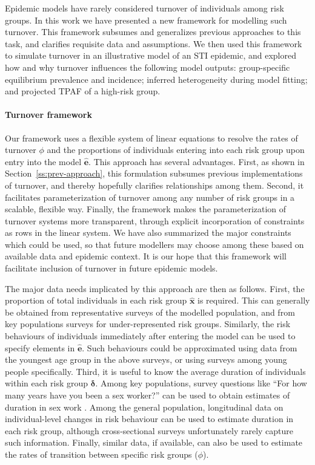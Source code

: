 Epidemic models have rarely considered turnover of individuals among risk groups.
In this work we have presented a new framework for modelling such turnover.
This framework subsumes and generalizes previous approaches to this task,
and clarifies requisite data and assumptions.
We then used this framework to simulate turnover in
an illustrative model of an STI epidemic,
and explored how and why turnover influences the following model outputs:
group-specific equilibrium prevalence and incidence;
inferred heterogeneity during model fitting; and
projected TPAF of a high-risk group.
\paragraph{Turnover framework}
Our framework uses a flexible system of linear equations to resolve
the rates of turnover $\phi$ and
the proportions of individuals entering into each risk group upon entry into the model $\bm{\hat{e}}$.
This approach has several advantages.
First, as shown in Section~\ref{ss:prev-approach},
this formulation subsumes previous implementations of turnover,
and thereby hopefully clarifies relationships among them.
Second, it facilitates parameterization of turnover among any number of risk groups
in a scalable, flexible way.
Finally, the framework makes the parameterization of turnover systems more transparent,
through explicit incorporation of constraints as rows in the linear system.
We have also summarized the major constraints which could be used,
so that future modellers may choose among these
based on available data and epidemic context.
It is our hope that this framework will facilitate
inclusion of turnover in future epidemic models.
\par
The major data needs implicated by this approach are then as follows.
First, the proportion of total individuals in each risk group $\bm{\hat{x}}$ is required.
This can generally be obtained from representative surveys of the modelled population,
and from key populations surveys for under-represented risk groups.
Similarly, the risk behaviours of individuals immediately after entering the model
can be used to specify elements in $\bm{\hat{e}}$.
Such behaviours could be approximated using data from the youngest age group
in the above surveys,
or using surveys among young people specifically.
Third, it is useful to know the average duration of individuals within each risk group $\bm{\delta}$.
Among key populations, survey questions like
``For how many years have you been a sex worker?''
can be used to obtain estimates of duration in sex work \citep{Watts2010}.
Among the general population,
longitudinal data on individual-level changes in risk behaviour
can be used to estimate duration in each risk group,
although cross-sectional surveys unfortunately rarely capture such information.
Finally, similar data, if available, can also be used to estimate
the rates of transition between specific risk groups ($\phi$).
